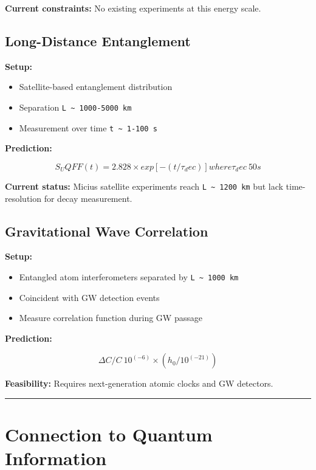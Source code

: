 \documentclass[12pt,a4paper]{article}
\begin{document}
\textbf{Current constraints:} No existing experiments at this energy scale.

\subsection{Long-Distance Entanglement}

\textbf{Setup:}

\begin{itemize}
  \item Satellite-based entanglement distribution
  \item Separation \texttt{L \textasciitilde{} 1000-5000 km}
  \item Measurement over time \texttt{t \textasciitilde{} 1-100 s}
\end{itemize}

\textbf{Prediction:}

\begin{equation}
S_UQFF(t) = 2.828 \times exp[-(t/\tau_dec)] where \tau_dec ~ 50 s
\end{equation}

\textbf{Current status:} Micius satellite experiments reach \texttt{L \textasciitilde{} 1200 km} but lack time-resolution for decay measurement.

\subsection{Gravitational Wave Correlation}

\textbf{Setup:}

\begin{itemize}
  \item Entangled atom interferometers separated by \texttt{L \textasciitilde{} 1000 km}
  \item Coincident with GW detection events
  \item Measure correlation function during GW passage
\end{itemize}

\textbf{Prediction:}

\begin{equation}
\Delta C/C ~ 10^(-6) \times (h_0/10^(-21))
\end{equation}

\textbf{Feasibility:} Requires next-generation atomic clocks and GW detectors.

\medskip\hrule\medskip

\section{Connection to Quantum Information}
\end{document}
